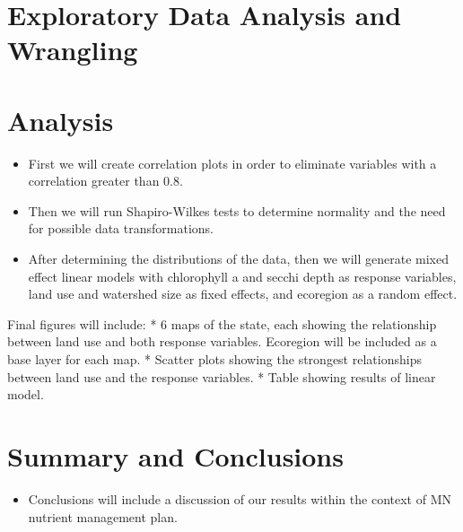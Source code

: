 \documentclass[12pt,]{article}
\providecommand{\tightlist}{%
  \setlength{\itemsep}{0pt}\setlength{\parskip}{0pt}}
\begin{document}
\newpage

\hypertarget{exploratory-data-analysis-and-wrangling}{%
\section{Exploratory Data Analysis and
Wrangling}\label{exploratory-data-analysis-and-wrangling}}

\newpage

\hypertarget{analysis}{%
\section{Analysis}\label{analysis}}

\begin{itemize}
\tightlist
\item
  First we will create correlation plots in order to eliminate variables
  with a correlation greater than 0.8.
\item
  Then we will run Shapiro-Wilkes tests to determine normality and the
  need for possible data transformations.
\item
  After determining the distributions of the data, then we will generate
  mixed effect linear models with chlorophyll a and secchi depth as
  response variables, land use and watershed size as fixed effects, and
  ecoregion as a random effect.
\end{itemize}

Final figures will include: * 6 maps of the state, each showing the
relationship between land use and both response variables. Ecoregion
will be included as a base layer for each map. * Scatter plots showing
the strongest relationships between land use and the response variables.
* Table showing results of linear model.

\newpage

\hypertarget{summary-and-conclusions}{%
\section{Summary and Conclusions}\label{summary-and-conclusions}}

\begin{itemize}
\tightlist
\item
  Conclusions will include a discussion of our results within the
  context of MN nutrient management plan.
\end{itemize}
\end{document}
